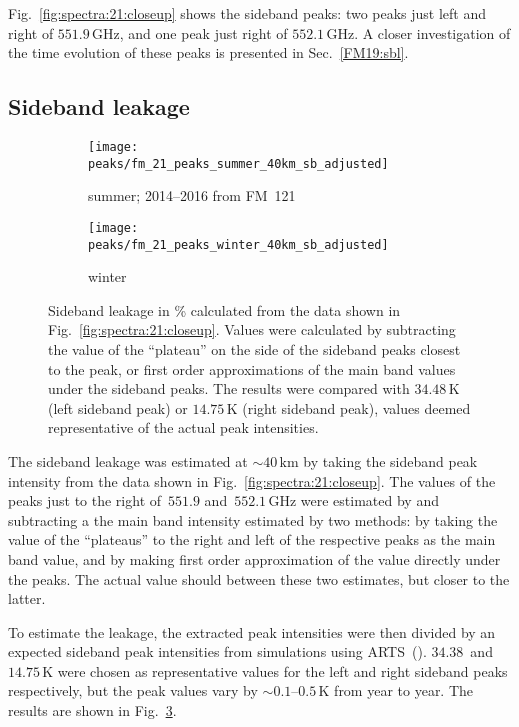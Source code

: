 Fig.~\ref{fig:spectra:21:closeup} shows the sideband peaks:  two peaks just
left and right of $551.9\,\mathrm{GHz}$, and one peak just right of
$552.1\,\mathrm{GHz}$.  A closer investigation of the time evolution of these
peaks is presented in Sec.~\ref{FM19:sbl}.


\subsection{Sideband leakage}
\label{FM21:sbl}

\begin{figure}[ht]
    \centering
    \begin{subfigure}[b]{0.9545\textwidth}
        \texttt{[image: peaks/fm\_21\_peaks\_summer\_40km\_sb\_adjusted]}
        \caption{summer; 2014--2016 from FM~121
            }\label{fig:sbl:21:summer}
    \end{subfigure}
    \begin{subfigure}[b]{0.9545\textwidth}
        \texttt{[image: peaks/fm\_21\_peaks\_winter\_40km\_sb\_adjusted]}
        \caption{winter}\label{fig:sbl:21:winter}
    \end{subfigure}
    \caption{Sideband leakage in \% calculated from the data shown in
        Fig.~\ref{fig:spectra:21:closeup}.  Values were calculated by
        subtracting the value of the ``plateau'' on the side of the sideband
        peaks closest to the  peak, or first order
        approximations of the main band values under the sideband peaks.  The
        results were compared with $34.48\,\mathrm{K}$ (left sideband peak) or
        $14.75\,\mathrm{K}$ (right sideband peak), values deemed
        representative of the actual peak intensities.
        }\label{fig:sbl:21}
\end{figure}

\noindent
The sideband leakage was estimated at $\sim40\,\mathrm{km}$ by taking the
sideband peak intensity from the data shown in
Fig.~\ref{fig:spectra:21:closeup}. The values of the peaks just to the right
of~$551.9$ and~$552.1\,\mathrm{GHz}$ were estimated by and subtracting a the
main band intensity estimated by two methods:  by taking the value of the
``plateaus'' to the right and left of the respective peaks as the main band
value, and by making first order approximation of the value directly under the
peaks.  The actual value should between these two estimates, but closer to the
latter.

To estimate the leakage, the extracted peak intensities were then
divided by an expected sideband peak intensities from simulations using
ARTS~(\cite{buehler:artst:05}).  $34.38$~and $14.75\,\mathrm{K}$ were chosen as
representative values for the left and right sideband peaks respectively, but
the peak values vary by $\sim0.1$--$0.5\,\mathrm{K}$ from year to year.  The
results are shown in Fig.~\ref{fig:sbl:21}.

